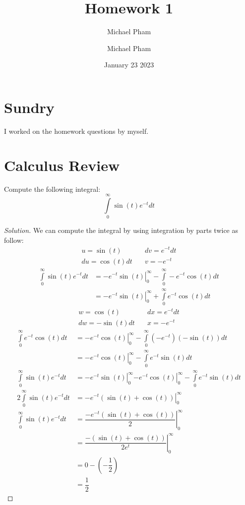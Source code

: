 \documentclass{article}
\title{#1}
\author{Michael Pham}
\date{#2}
\newenvironment{solution}{\begin{proof}[Solution]}{\end{proof}}
\newcommand*{\eval}[3]{\left.#1\right\rvert_{#2}^{#3}}
\newcommand{\mytitle}[2]{%
	\title{#1}
	\author{Michael Pham}
	\date{#2}
	\maketitle
	\newpage
	\tableofcontents
	\newpage
}
\let\oldint\int
\renewcommand{\int}[2]{\oldint\limits_{#1}^{#2}}
\begin{document}
\mytitle{Homework 1}{January 23 2023}

\setcounter{section}{-1}
\section{Sundry}
I worked on the homework questions by myself.

\newpage

\section{Calculus Review}
\begin{hw}
	Compute the following integral:
	\begin{equation*}
		\int{0}{\infty} \sin(t)e^{-t} dt
	\end{equation*}
\end{hw}
\begin{solution}
	We can compute the integral by using integration by parts twice as follow:
	\begin{align*}
		u = \sin(t) &\quad dv = e^{-t}dt \\
		du = \cos\left( t \right)dt &\quad v = -e^{-t}
	\end{align*}
	\begin{align*}
		\int{0}{\infty} \sin(t)e^{-t} dt &= \eval{-e^{-t}\sin\left( t \right)}{0}{\infty} - \int{0}{\infty} -e^{-t}\cos\left( t \right)dt \\
		&= \eval{-e^{-t}\sin\left( t \right)}{0}{\infty} + \int{0}{\infty} e^{-t}\cos\left( t \right)dt
	\end{align*}
	\begin{align*}
		w = \cos\left( t \right) &\quad dx = e^{-t}dt \\
		dw = -\sin\left( t \right)dt &\quad x = -e^{-t}
	\end{align*}
	\begin{align*}
		\int{0}{\infty} e^{-t}\cos\left( t \right)dt &= \eval{-e^{-t}\cos\left( t \right)}{0}{\infty} - \int{0}{\infty} (-e^{-t})(-\sin\left( t \right))dt \\
		&= \eval{-e^{-t}\cos\left( t \right)}{0}{\infty} - \int{0}{\infty} e^{-t}\sin\left( t \right)dt \\
		\int{0}{\infty} \sin(t)e^{-t} dt &= \eval{-e^{-t}\sin\left( t \right)}{0}{\infty} \eval{-e^{-t}\cos\left( t \right)}{0}{\infty} - \int{0}{\infty} e^{-t}\sin\left( t \right)dt \\
		2\int{0}{\infty} \sin(t)e^{-t} dt &= \eval{-e^{-t}(\sin\left( t \right) + \cos\left( t \right))}{0}{\infty} \\
		\int{0}{\infty} \sin(t)e^{-t} dt &= \eval{\dfrac{-e^{-t}(\sin\left( t \right) + \cos\left( t \right))}{2}}{0}{\infty} \\
		&= \eval{\dfrac{-(\sin\left( t \right) + \cos\left( t \right))}{2e^{t}}}{0}{\infty} \\
		&= 0 - (-\dfrac{1}{2}) \\
		&= \dfrac{1}{2}
	\end{align*}
\end{solution}
\end{document}
